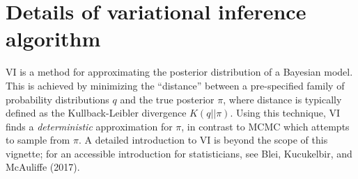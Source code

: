 \documentclass[]{article}
\newenvironment{Shaded}{\begin{snugshade}}{\end{snugshade}}
\newcommand{\CommentTok}[1]{\textcolor[rgb]{0.56,0.35,0.01}{\textit{#1}}}
\newcommand{\ControlFlowTok}[1]{\textcolor[rgb]{0.13,0.29,0.53}{\textbf{#1}}}
\newcommand{\DataTypeTok}[1]{\textcolor[rgb]{0.13,0.29,0.53}{#1}}
\newcommand{\DecValTok}[1]{\textcolor[rgb]{0.00,0.00,0.81}{#1}}
\newcommand{\KeywordTok}[1]{\textcolor[rgb]{0.13,0.29,0.53}{\textbf{#1}}}
\newcommand{\NormalTok}[1]{#1}
\newcommand{\OperatorTok}[1]{\textcolor[rgb]{0.81,0.36,0.00}{\textbf{#1}}}
\newcommand{\OtherTok}[1]{\textcolor[rgb]{0.56,0.35,0.01}{#1}}
\newcommand{\StringTok}[1]{\textcolor[rgb]{0.31,0.60,0.02}{#1}}
\begin{document}
\begin{Shaded}
\end{Shaded}

\hypertarget{algo}{%
\section{Details of variational inference algorithm}\label{algo}}

VI is a method for approximating the posterior distribution of a
Bayesian model. This is achieved by minimizing the ``distance'' between
a pre-specified family of probability distributions \(q\) and the true
posterior \(\pi\), where distance is typically defined as the
Kullback-Leibler divergence \(K(q || \pi)\). Using this technique, VI
finds a \emph{deterministic} approximation for \(\pi\), in contrast to
MCMC which attempts to sample from \(\pi\). A detailed introduction to
VI is beyond the scope of this vignette; for an accessible introduction
for statisticians, see Blei, Kucukelbir, and McAuliffe (2017).
\end{document}
